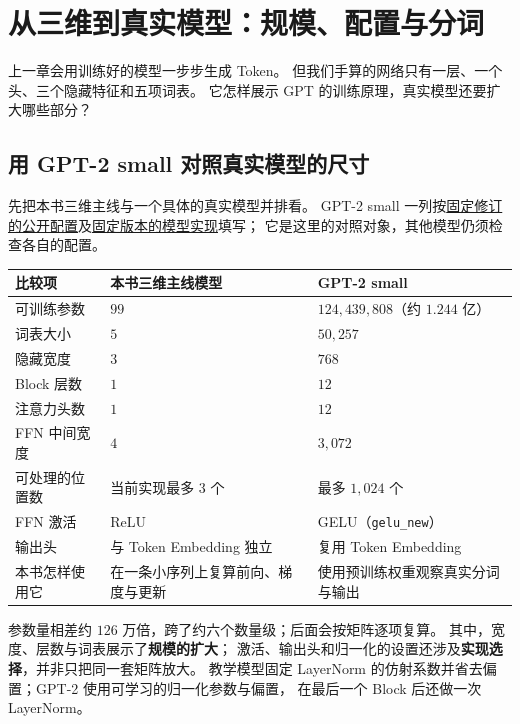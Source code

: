 \chapterrule
\section{从三维到真实模型：规模、配置与分词}
\label{intro:real-models}

上一章会用训练好的模型一步步生成 Token。
但我们手算的网络只有一层、一个头、三个隐藏特征和五项词表。
它怎样展示 GPT 的训练原理，真实模型还要扩大哪些部分？

\subsection{用 GPT-2 small 对照真实模型的尺寸}
\label{sec:toy-real-model-comparison}

先把本书三维主线与一个具体的真实模型并排看。
GPT-2 small 一列按\href{https://huggingface.co/openai-community/gpt2/blob/607a30d783dfa663caf39e06633721c8d4cfcd7e/config.json}{固定修订的公开配置}及\hyperref[source:gpt2-implementation]{固定版本的模型实现}填写；
它是这里的对照对象，其他模型仍须检查各自的配置。

\begin{center}\small
\renewcommand{\arraystretch}{1.25}
\begin{tabularx}{\linewidth}{@{}p{30mm}XX@{}}
\toprule
比较项 & 本书三维主线模型 & GPT-2 small\\\midrule
可训练参数 & $99$ & $124{,}439{,}808$（约 $1.244$ 亿）\\
词表大小 & $5$ & $50{,}257$\\
隐藏宽度 & $3$ & $768$\\
Block 层数 & $1$ & $12$\\
注意力头数 & $1$ & $12$\\
FFN 中间宽度 & $4$ & $3{,}072$\\
可处理的位置数 & 当前实现最多 $3$ 个 & 最多 $1{,}024$ 个\\
FFN 激活 & ReLU & GELU（\texttt{gelu\_new}）\\
输出头 & 与 Token Embedding 独立 & 复用 Token Embedding\\
本书怎样使用它 & 在一条小序列上复算前向、梯度与更新 & 使用预训练权重观察真实分词与输出\\
\bottomrule
\end{tabularx}
\end{center}

参数量相差约 $126$ 万倍，跨了约六个数量级；后面会按矩阵逐项复算。
其中，宽度、层数与词表展示了\textbf{规模的扩大}；
激活、输出头和归一化的设置还涉及\textbf{实现选择}，并非只把同一套矩阵放大。
教学模型固定 LayerNorm 的仿射系数并省去偏置；GPT-2 使用可学习的归一化参数与偏置，
在最后一个 Block 后还做一次 LayerNorm。

